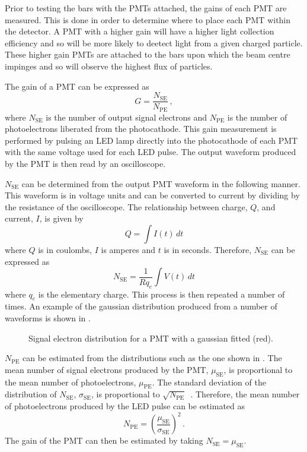 Prior to testing the bars with the PMTs attached, the gains of each PMT are measured.
This is done in order to determine where to place each PMT within the detector.
A PMT with a higher gain will have a higher light collection efficiency and so will be more likely to deetect light from a given charged particle.
These higher gain PMTs are attached to the bars upon which the beam centre impinges and so will observe the highest flux of particles.

The gain of a PMT can be expressed as
\begin{equation}
  G = \frac{N_{\text{SE}}}{N_{\text{PE}}} \, ,
\end{equation}
where $N_{\text{SE}}$ is the number of output signal electrons and $N_{\text{PE}}$ is the number of photoelectrons liberated from the photocathode.
This gain measurement is performed by pulsing an LED lamp directly into the photocathode of each PMT with the same voltage used for each LED pulse.
The output waveform produced by the PMT is then read by an oscilloscope.

$N_{\text{SE}}$ can be determined from the output PMT waveform in the following manner.
This waveform is in voltage units and can be converted to current by dividing by the resistance of the oscilloscope.
The relationship between charge, $Q$, and current, $I$, is given by
\begin{equation}
  Q = \int I(t) \, dt
\end{equation}
where $Q$ is in coulombs, $I$ is amperes and $t$ is in seconds.
Therefore, $N_{\text{SE}}$ can be expressed as
\begin{equation}
  N_{\text{SE}} = \frac{1}{R q_{e}} \int V(t) \, dt
\end{equation}
where $q_{e}$ is the elementary charge.
This process is then repeated a number of times.
An example of the gaussian distribution produced from a number of waveforms is shown in .

\begin{figure}[h]
  \begin{adjustbox}{max totalsize={\textwidth}, center}
    
  \end{adjustbox}
  \caption[Signal electron distribution for a PMT]{Signal electron distribution for a PMT with a gaussian fitted (red).}
  \label{fig:N_se}
\end{figure}

$N_{\text{PE}}$ can be estimated from the distributions such as the one shown in .
The mean number of signal electrons produced by the PMT, $\mu_{\text{SE}}$, is proportional to the mean number of photoelectrons, $\mu_{\text{PE}}$.
The standard deviation of the distribution of $N_{\text{SE}}$, $\sigma_{\text{SE}}$, is proportional to $\sqrt{N_{\text{PE}}}$~\cite{photoelectrons}.
Therefore, the mean number of photoelectrons produced by the LED pulse can be estimated as
\begin{equation}
  N_{\text{PE}} = \left( \frac{ \mu_{\text{SE}} }{ \sigma_{\text{SE}} }  \right)^{2} \, .
\end{equation}
The gain of the PMT can then be estimated by taking $N_{\text{SE}} = \mu_{\text{SE}}$.

